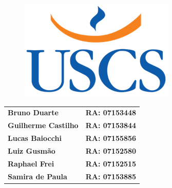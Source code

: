   \begin{capa}%
    \begin{figure}[h!]%
        \centering%
        \includegraphics[scale=1]{figs/Logo_uscs}%
      \end{figure}%
    \center   
    \ABNTEXchapterfont\bfseries\large{\imprimirinstituicao}
 
\vspace{2.5cm}

    \ABNTEXchapterfont\bfseries\large\imprimirtitulo 
    \vspace{2.5cm}
    
    \begin{flushright}
    
\begin{tabular}{@{}ll@{}}
    \hspace{.5cm} \textbf{Bruno Duarte} & \textbf{RA: 07153448} \\ %
    \hspace{.5cm} \textbf{Guilherme Castilho} & \textbf{RA: 07153844} \\
    \hspace{.5cm} \textbf{Lucas Baiocchi} & \textbf{RA: 07155856} \\
    \hspace{.5cm} \textbf{Luiz Gusmão} & \textbf{RA: 07152580} \\
    \hspace{.5cm} \textbf{Raphael Frei} & \textbf{RA: 07152515} \\ 
    \hspace{.5cm} \textbf{Samira de Paula} & \textbf{RA: 07153885}
\end{tabular}
	
    \end{flushright}
    \vfill
%
    \large\imprimirlocal \\ \large\imprimirdata

    \vspace*{1cm}
  \end{capa}
